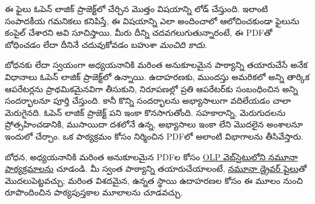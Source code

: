 \documentclass[../include/open-logic-part]{subfiles}
\begin{document}
\clearpage

\begin{editorial}
ఈ ఫైలు ఓపెన్ లాజిక్ ప్రాజెక్ట్‌లో చేర్చిన మొత్తం విషయాన్ని లోడ్
చేస్తుంది. ఇలాంటి సంపాదకీయ గమనికలు కనిపిస్తే, ఈ విషయాన్ని
ఎలా అందించాలో ఆలోచించకుండా ఫైలును కంపైల్ చేశారని అవి సూచిస్తాయి.
మీరు దీన్ని చదవగలుగుతున్నారంటే, ఈ PDFతో బోధించడం లేదా
దీనినే చదువుకోవడం బహుశా \emph{మంచిది కాదు}.

బోధనకు లేదా స్వయంగా అధ్యయనానికి మరింత అనుకూలమైన పాఠ్యాన్ని
తయారుచేసే అనేక విధానాలు ఓపెన్ లాజిక్ ప్రాజెక్ట్‌లో ఉన్నాయి.
ఉదాహరణకు, ముందస్తు అమరికలో అన్ని తార్కిక ఆపరేటర్లను
ప్రాథమికమైనవిగా తీసుకుని, నిరూపణల్లో ప్రతి ఆపరేటర్‌కు సంబంధించిన
అన్ని సందర్భాలనూ పూర్తి చేస్తుంది. కానీ కొన్ని సందర్భాలను
అభ్యాసాలుగా వదిలేయడం చాలా మెరుగైనది. ఓపెన్ లాజిక్ ప్రాజెక్ట్
పని ఇంకా కొనసాగుతోంది. సహకారాన్ని, మెరుగుదలను ప్రోత్సహించడానికి,
ముసాయిదా దశలోనే ఉన్న, అభ్యాసాలు ఇంకా లేని మొదలైన అంశాలనూ
ఇందులో చేర్చాం. ఒక పాఠ్యక్రమం కోసం నిర్మించిన PDFలో అలాంటి
విభాగాలను తీసివేస్తారు.

బోధన, అధ్యయనానికి మరింత అనుకూలమైన PDFల కోసం
\href{http://builds.openlogicproject.org/}{OLP వెబ్‌సైటులోని నమూనా పాఠ్యక్రమాలను}
చూడండి. మీ స్వంత పాఠ్యాన్ని తయారుచేయాలంటే,
\href{https://github.com/OpenLogicProject/OpenLogic/tree/master/courses/sample}{నమూనా డ్రైవర్ ఫైలు}తో
మొదలుపెట్టవచ్చు; మరింత విశదమైన, ఉన్నత స్థాయి ఉదాహరణల కోసం ఈ మూలం నుంచి
రూపొందించిన పాఠ్యపుస్తకాల మూలాలను చూడవచ్చు.
\end{editorial}


















\end{document}
